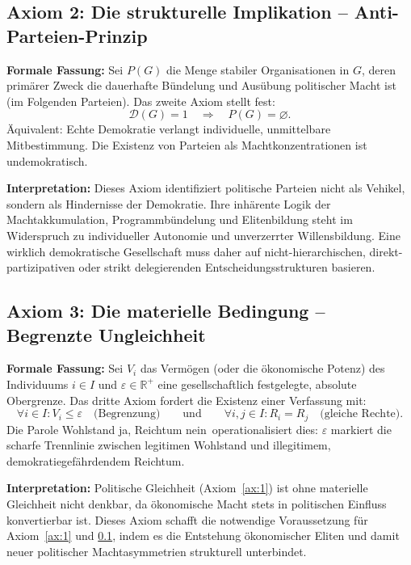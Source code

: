 \subsection{Axiom 2: Die strukturelle Implikation -- Anti-Parteien-Prinzip}
\label{ax:2}

\textbf{Formale Fassung:}
Sei $P(G)$ die Menge stabiler Organisationen in $G$, deren primärer Zweck die dauerhafte Bündelung und Ausübung politischer Macht ist (im Folgenden \glqq Parteien\grqq). Das zweite Axiom stellt fest:
\[
\boxed{\mathcal{D}(G) = 1 \quad \Rightarrow \quad P(G) = \varnothing.}
\]
Äquivalent: Echte Demokratie verlangt individuelle, unmittelbare Mitbestimmung. Die Existenz von Parteien als Machtkonzentrationen ist undemokratisch.

\textbf{Interpretation:}
Dieses Axiom identifiziert politische Parteien nicht als Vehikel, sondern als Hindernisse der Demokratie. Ihre inhärente Logik der Machtakkumulation, Programmbündelung und Elitenbildung steht im Widerspruch zu individueller Autonomie und unverzerrter Willensbildung. Eine wirklich demokratische Gesellschaft muss daher auf nicht-hierarchischen, direkt-partizipativen oder strikt delegierenden Entscheidungsstrukturen basieren.

\subsection{Axiom 3: Die materielle Bedingung -- Begrenzte Ungleichheit}
\label{ax:3}

\textbf{Formale Fassung:}
Sei $V_i$ das Vermögen (oder die ökonomische Potenz) des Individuums $i \in I$ und $\varepsilon \in \mathbb{R}^+$ eine gesellschaftlich festgelegte, absolute Obergrenze. Das dritte Axiom fordert die Existenz einer Verfassung mit:
\[
\boxed{\forall i \in I: V_i \leq \varepsilon \quad \text{(Begrenzung)} \qquad \text{und} \qquad \forall i,j \in I: R_i = R_j \quad \text{(gleiche Rechte)}.}
\]
Die Parole \glqq Wohlstand ja, Reichtum nein\grqq\ operationalisiert dies: $\varepsilon$ markiert die scharfe Trennlinie zwischen legitimen Wohlstand und illegitimem, demokratiegefährdendem Reichtum.

\textbf{Interpretation:}
Politische Gleichheit (Axiom~\ref{ax:1}) ist ohne materielle Gleichheit nicht denkbar, da ökonomische Macht stets in politischen Einfluss konvertierbar ist. Dieses Axiom schafft die notwendige Voraussetzung für Axiom~\ref{ax:1} und \ref{ax:2}, indem es die Entstehung ökonomischer Eliten und damit neuer politischer Machtasymmetrien strukturell unterbindet.

